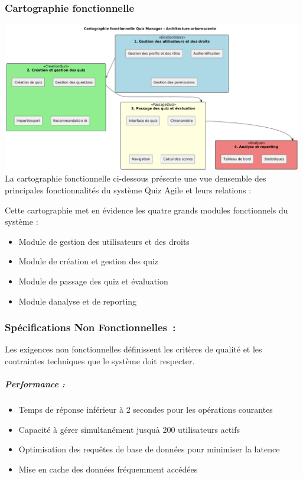 \documentclass[12pt,a4paper,twoside]{report}
\begin{document}
\hypertarget{cartographie-fonctionnelle}{%
\subsubsection{Cartographie
fonctionnelle}\label{cartographie-fonctionnelle}}

\includegraphics[width=5.17292in,height=2.56944in]{latex_media/media/image11.png}La
cartographie fonctionnelle ci-dessous présente une vue
d\textquotesingle ensemble des principales fonctionnalités du système
Quiz Agile et leurs relations :

Cette cartographie met en évidence les quatre grands modules
fonctionnels du système :

\begin{itemize}
\item
  Module de gestion des utilisateurs et des droits
\item
  Module de création et gestion des quiz
\item
  Module de passage des quiz et évaluation
\item
  Module d\textquotesingle analyse et de reporting
\end{itemize}

\hypertarget{spuxe9cifications-non-fonctionnelles}{%
\subsubsection{Spécifications Non
Fonctionnelles~:}\label{spuxe9cifications-non-fonctionnelles}}

Les exigences non fonctionnelles définissent les critères de qualité et
les contraintes techniques que le système doit respecter.

\hypertarget{performance}{%
\subparagraph{Performance :}\label{performance}}

\begin{itemize}
\item
  Temps de réponse inférieur à 2 secondes pour les opérations courantes
\item
  Capacité à gérer simultanément jusqu\textquotesingle à 200
  utilisateurs actifs
\item
  Optimisation des requêtes de base de données pour minimiser la latence
\item
  Mise en cache des données fréquemment accédées
\end{itemize}
\end{document}
